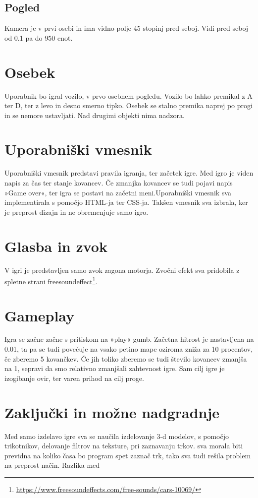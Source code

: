 \documentclass[a4paper]{article}
\begin{document}
\subsection{Pogled}
Kamera je v prvi osebi in ima vidno polje 45 stopinj pred seboj. Vidi pred seboj od 0.1 pa do 950 enot.

\section{Osebek}
Uporabnik bo igral vozilo, v prvo osebnem pogledu. Vozilo bo lahko premikal z A ter D, ter z levo in desno smerno tipko. Osebek se stalno premika naprej po progi in se nemore ustavljati. Nad drugimi objekti nima nadzora.

\section{Uporabniški vmesnik}
Uporabniški vmesnik predstavi pravila igranja, ter začetek igre. Med igro je viden napis za čas ter stanje kovancev. Če zmanjka kovancev se tudi pojavi napis »Game over«, ter igra se postavi na začetni meni.Uporabniški vmesnik sva implementirala s pomočjo HTML-ja ter CSS-ja. Takšen vmesnik sva izbrala, ker je preprost dizajn in ne obremenjuje samo igro. 

\section{Glasba in zvok}
V igri je predstavljen samo zvok zagona motorja. Zvočni efekt sva pridobila z spletne strani freesoundeffect\footnote{\url{https://www.freesoundeffects.com/free-sounds/cars-10069/}}.

\section{Gameplay}
Igra se začne začne s pritiskom na »play« gumb. Začetna hitrost je nastavljena na 0.01, ta pa se tudi povečuje na vsako petino mape oziroma zniža za 10 procentov, če zberemo 5 kovančkev. Če jih toliko zberemo se tudi število kovancev zmanjša na 1, sepravi da smo relativno zmanjšali zahtevnost igre. Sam cilj igre je izogibanje ovir, ter varen prihod na cilj proge.


\section{Zaključki in možne nadgradnje}
Med samo izdelavo igre sva se naučila izdelovanje 3-d modelov, s pomočjo trikotnikov, delovanje filtrov na teksture, pri zaznavanju trkov. sva morala biti previdna na koliko časa bo program spet zaznač trk, tako sva tudi rešila problem na preprost način. Razlika med 



\small
\end{document}

